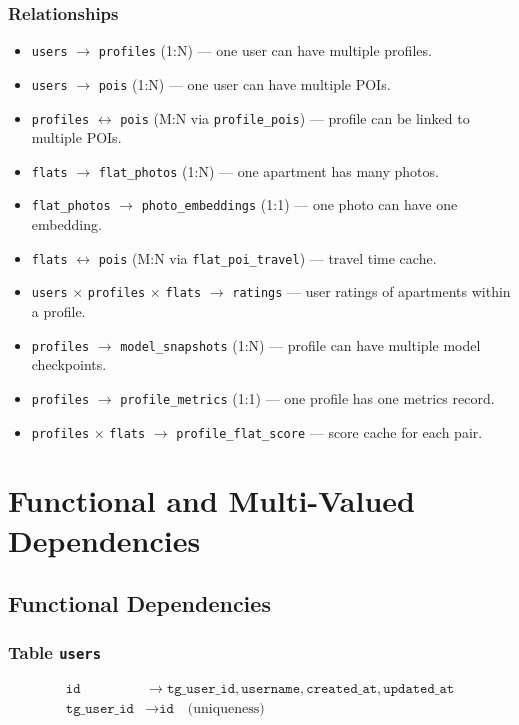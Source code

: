 \documentclass[12pt,a4paper]{article}
\begin{document}
\subsubsection{Relationships}

\begin{itemize}
    \item \texttt{users} $\rightarrow$ \texttt{profiles} (1:N) — one user can have multiple profiles.
    \item \texttt{users} $\rightarrow$ \texttt{pois} (1:N) — one user can have multiple POIs.
    \item \texttt{profiles} $\leftrightarrow$ \texttt{pois} (M:N via \texttt{profile\_pois}) — profile can be linked to multiple POIs.
    \item \texttt{flats} $\rightarrow$ \texttt{flat\_photos} (1:N) — one apartment has many photos.
    \item \texttt{flat\_photos} $\rightarrow$ \texttt{photo\_embeddings} (1:1) — one photo can have one embedding.
    \item \texttt{flats} $\leftrightarrow$ \texttt{pois} (M:N via \texttt{flat\_poi\_travel}) — travel time cache.
    \item \texttt{users} $\times$ \texttt{profiles} $\times$ \texttt{flats} $\rightarrow$ \texttt{ratings} — user ratings of apartments within a profile.
    \item \texttt{profiles} $\rightarrow$ \texttt{model\_snapshots} (1:N) — profile can have multiple model checkpoints.
    \item \texttt{profiles} $\rightarrow$ \texttt{profile\_metrics} (1:1) — one profile has one metrics record.
    \item \texttt{profiles} $\times$ \texttt{flats} $\rightarrow$ \texttt{profile\_flat\_score} — score cache for each pair.
\end{itemize}

\section{Functional and Multi-Valued Dependencies}

\subsection{Functional Dependencies}

\subsubsection{Table \texttt{users}}
\begin{align}
    \texttt{id} &\rightarrow \texttt{tg\_user\_id}, \texttt{username}, \texttt{created\_at}, \texttt{updated\_at} \\
    \texttt{tg\_user\_id} &\rightarrow \texttt{id} \quad \text{(uniqueness)}
\end{align}
\end{document}
